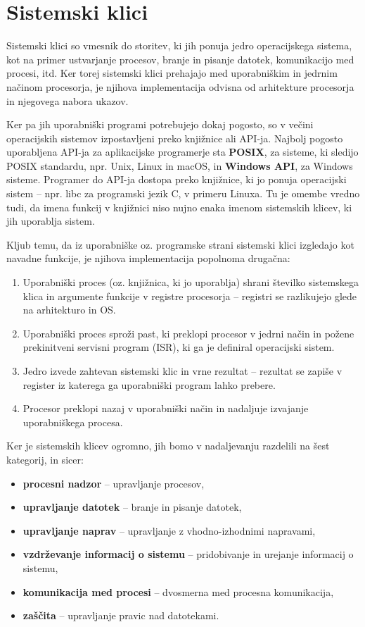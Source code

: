 \documentclass[a4paper,12pt,openright]{book}
\begin{document}
\section{Sistemski klici}

Sistemski klici so vmesnik do storitev, ki jih ponuja jedro operacijskega sistema, kot na primer ustvarjanje procesov, branje in pisanje datotek, komunikacijo med procesi, itd.
Ker torej sistemski klici prehajajo med uporabniškim in jedrnim načinom procesorja, je njihova implementacija odvisna od arhitekture procesorja in njegovega nabora ukazov.

Ker pa jih uporabniški programi potrebujejo dokaj pogosto, so v večini operacijskih sistemov izpostavljeni preko knjižnice ali API-ja.
Najbolj pogosto uporabljena API-ja za aplikacijske programerje sta \textbf{POSIX}, za sisteme, ki sledijo POSIX standardu, npr. Unix, Linux in macOS, in \textbf{Windows API}, za Windows sisteme.
Programer do API-ja dostopa preko knjižnice, ki jo ponuja operacijski sistem -- npr. libc za programski jezik C, v primeru Linuxa.
Tu je omembe vredno tudi, da imena funkcij v knjižnici niso nujno enaka imenom sistemskih klicev, ki jih uporablja sistem.
\cite{Silberschatz_Galvin_Gagne_2018}

Kljub temu, da iz uporabniške oz. programske strani sistemski klici izgledajo kot navadne funkcije, je njihova implementacija popolnoma drugačna:
\begin{enumerate}
	\item Uporabniški proces (oz. knjižnica, ki jo uporablja) shrani številko sistemskega klica in argumente funkcije v registre procesorja -- registri se razlikujejo glede na arhitekturo in OS.
	\item Uporabniški proces sproži past, ki preklopi procesor v jedrni način in požene prekinitveni servisni program (ISR), ki ga je definiral operacijski sistem.
	\item Jedro izvede zahtevan sistemski klic in vrne rezultat -- rezultat se zapiše v register iz katerega ga uporabniški program lahko prebere.
	\item Procesor preklopi nazaj v uporabniški način in nadaljuje izvajanje uporabniškega procesa. \cite{Tanenbaum_Bos_2023}
\end{enumerate}

Ker je sistemskih klicev ogromno, jih bomo v nadaljevanju razdelili na šest kategorij, in sicer:
\begin{itemize}
	\item \textbf{procesni nadzor} -- upravljanje procesov,
	\item \textbf{upravljanje datotek} -- branje in pisanje datotek,
	\item \textbf{upravljanje naprav} -- upravljanje z vhodno-izhodnimi napravami,
	\item \textbf{vzdrževanje informacij o sistemu} -- pridobivanje in urejanje informacij o sistemu,
	\item \textbf{komunikacija med procesi} -- dvosmerna med procesna komunikacija,
	\item \textbf{zaščita} -- upravljanje pravic nad datotekami. \cite{Silberschatz_Galvin_Gagne_2018}
\end{itemize}
\end{document}
